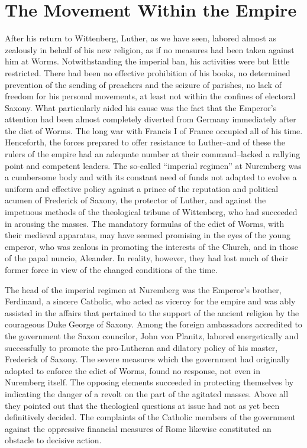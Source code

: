 \section{The Movement Within the Empire}

After his return to Wittenberg, Luther, as we have seen, labored
almost as zealously in behalf of his new religion, as if no measures
had been taken against him at Worms. Notwithstanding the imperial
ban, his activities were but little restricted. There had been no effective
prohibition of his books, no determined prevention of the
sending of preachers and the seizure of parishes, no lack of freedom
for his personal movements, at least not within the confines of
electoral Saxony. What particularly aided his cause was the fact
that the Emperor’s attention had been almost completely diverted
from Germany immediately after the diet of Worms. The long war
with Francis I of France occupied all of his time. Henceforth, the
forces prepared to offer resistance to Luther--and of these the rulers
of the empire had an adequate number at their command--lacked
a rallying point and competent leaders. The so-called “imperial
regimen” at Nuremberg was a cumbersome body and with its constant need
of funds not adapted to evolve a uniform and effective
policy against a prince of the reputation and political acumen of
Frederick of Saxony, the protector of Luther, and against the impetuous
methods of the theological tribune of Wittenberg, who had
succeeded in arousing the masses. The mandatory formulas of the
edict of Worms, with their medieval apparatus, may have seemed
promising in the eyes of the young emperor, who was zealous in
promoting the interests of the Church, and in those of the papal
nuncio, Aleander. In reality, however, they had lost much of their
former force in view of the changed conditions of the time.

The head of the imperial regimen at Nuremberg was the Emperor’s
brother, Ferdinand, a sincere Catholic, who acted as viceroy for the
empire and was ably assisted in the affairs that pertained to the support
of the ancient religion by the courageous Duke George of
Saxony. Among the foreign ambassadors accredited to the government the
Saxon councilor, John von Planitz, labored energetically
and successfully to promote the pro-Lutheran and dilatory policy
of his master, Frederick of Saxony. The severe measures which
the government had originally adopted to enforce the edict of
Worms, found no response, not even in Nuremberg itself. The opposing elements
succeeded in protecting themselves by indicating the
danger of a revolt on the part of the agitated masses. Above all
they pointed out that the theological questions at issue had not as
yet been definitively decided. The complaints of the Catholic members of
the government against the oppressive financial measures
of Rome likewise constituted an obstacle to decisive action.

